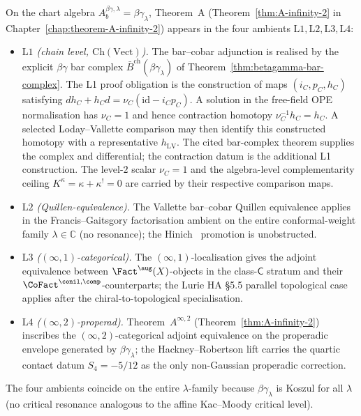 \begin{remark}
\label{rem:betagamma-theorem-A-four-lanes}
On the chart algebra $A_b^{\beta\gamma,\lambda}=\beta\gamma_\lambda$,
Theorem~A (Theorem~\ref{thm:A-infinity-2} in
Chapter~\ref{chap:theorem-A-infinity-2}) appears in the four ambients
$\mathrm{L}1,\mathrm{L}2,\mathrm{L}3,\mathrm{L}4$:
\begin{itemize}
\item \emph{$\mathrm{L}1$ (chain level, $\mathrm{Ch}(\mathrm{Vect})$).}
The bar--cobar adjunction is realised by the explicit
$\beta\gamma$ bar complex
$\bar{B}^{\mathrm{ch}}(\beta\gamma_\lambda)$ of
Theorem~\ref{thm:betagamma-bar-complex}.  The L1 proof obligation is
the construction of maps $(i_C,p_C,h_C)$ satisfying
$d h_C+h_Cd=\nu_C(\mathrm{id}-i_Cp_C)$.  A solution in the
free-field OPE normalisation has $\nu_C=1$ and hence contraction
homotopy $\nu_C^{-1}h_C=h_C$.  A selected Loday--Vallette comparison
may then identify this constructed homotopy with a representative
$h_{\mathrm{LV}}$.  The cited bar-complex theorem supplies the
complex and differential; the contraction datum is the additional
L1 construction.  The level-$2$ scalar $\nu_C=1$ and the
algebra-level complementarity ceiling
$K^\kappa=\kappa+\kappa^!=0$ are carried by their respective
comparison maps.
\item \emph{$\mathrm{L}2$ (Quillen-equivalence).}
The Vallette bar--cobar Quillen equivalence
\cite[Theorem~2.1]{Val16} applies in the Francis--Gaitsgory
factorisation ambient on the entire conformal-weight family
$\lambda\in\mathbb{C}$ (no resonance); the Hinich~\cite{Hinich2003}
promotion is unobstructed.
\item \emph{$\mathrm{L}3$ ($(\infty,1)$-categorical).}
The $(\infty,1)$-localisation gives the adjoint equivalence between
$\Fact^{\aug}(X)$-objects in the class-$\mathsf{C}$ stratum and
their $\CoFact^{\conil,\comp}$-counterparts; the Lurie HA \S5.5
parallel topological case applies after the chiral-to-topological
specialisation.
\item \emph{$\mathrm{L}4$ ($(\infty,2)$-properad).}
Theorem~$A^{\infty,2}$ (Theorem~\ref{thm:A-infinity-2})
inscribes the $(\infty,2)$-categorical adjoint equivalence on the
properadic envelope generated by $\beta\gamma_\lambda$; the
Hackney--Robertson lift carries the quartic contact datum
$S_4=-5/12$ as the only non-Gaussian properadic correction.
\end{itemize}
The four ambients coincide on the entire $\lambda$-family because
$\beta\gamma_\lambda$ is Koszul for all $\lambda$
(no critical resonance analogous to the affine Kac--Moody
critical level).
\end{remark}

